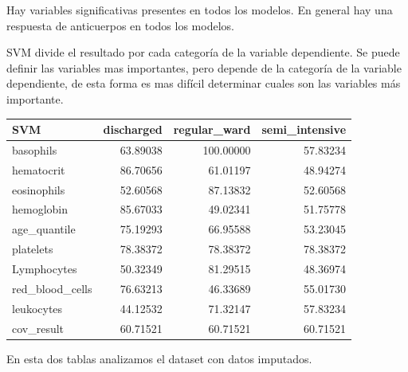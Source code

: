 \documentclass[
]{article}
\begin{document}
Hay variables significativas presentes en todos los modelos. En general
hay una respuesta de anticuerpos en todos los modelos.

SVM divide el resultado por cada categoría de la variable dependiente.
Se puede definir las variables mas importantes, pero depende de la
categoría de la variable dependiente, de esta forma es mas difícil
determinar cuales son las variables más importante.

\begin{longtable}[]{@{}lrrr@{}}
\toprule()
SVM & discharged & regular\_ward & semi\_intensive \\
\midrule()
\endhead
basophils & 63.89038 & 100.00000 & 57.83234 \\
hematocrit & 86.70656 & 61.01197 & 48.94274 \\
eosinophils & 52.60568 & 87.13832 & 52.60568 \\
hemoglobin & 85.67033 & 49.02341 & 51.75778 \\
age\_quantile & 75.19293 & 66.95588 & 53.23045 \\
platelets & 78.38372 & 78.38372 & 78.38372 \\
Lymphocytes & 50.32349 & 81.29515 & 48.36974 \\
red\_blood\_cells & 76.63213 & 46.33689 & 55.01730 \\
leukocytes & 44.12532 & 71.32147 & 57.83234 \\
cov\_result & 60.71521 & 60.71521 & 60.71521 \\
\bottomrule()
\end{longtable}

En esta dos tablas analizamos el dataset con datos imputados.
\end{document}
